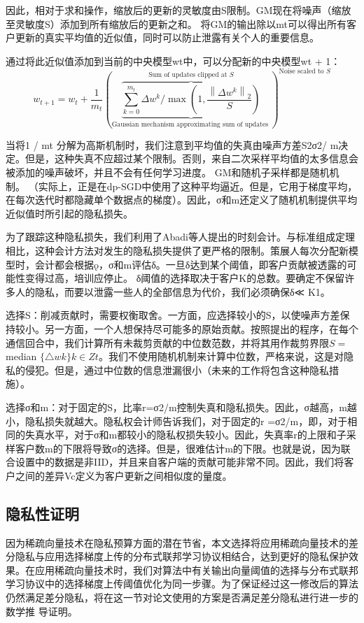 因此，相对于求和操作，缩放后的更新的灵敏度由S限制。GM现在将噪声（缩放至灵敏度S）添加到所有缩放后的更新之和。 将GM的输出除以mt可以得出所有客户更新的真实平均值的近似值，同时可以防止泄露有关个人的重要信息。

通过将此近似值添加到当前的中央模型wt中，可以分配新的中央模型wt + 1：
\begin{equation}
w_{t+1}=w_{t}+\frac{1}{m_{t}}(\underbrace{\overbrace{\sum_{k=0}^{m_{t}} \Delta w^{k} / \max \left(1, \frac{\left\|\Delta w^{k}\right\|_{2}}{S}\right)}^{\text {Sum of updates clipped at } S}}_{\text {Gaussian mechanism approximating sum of updates }})^{\text {Noise scaled to } S}
\end{equation}


当将1 / mt 分解为高斯机制时，我们注意到平均值的失真由噪声方差S2σ2/ m决定。但是，这种失真不应超过某个限制。否则，来自二次采样平均值的太多信息会被添加的噪声破坏，并且不会有任何学习进度。 GM和随机子采样都是随机机制。 （实际上，\cite{ref48}正是在dp-SGD中使用了这种平均逼近。但是，它用于梯度平均，在每次迭代时都隐藏单个数据点的梯度）。因此，σ和m还定义了随机机制提供平均近似值时所引起的隐私损失。

为了跟踪这种隐私损失，我们利用了Abadi等人提出的时刻会计\cite{ref49}。与标准组成定理相比，这种会计方法对发生的隐私损失提供了更严格的限制。策展人每次分配新模型时，会计都会根据ǫ，σ和m评估δ。一旦δ达到某个阈值，即客户贡献被透露的可能性变得过高，培训应停止。 δ阈值的选择取决于客户K的总数。要确定不保留许多人的隐私，而要以泄露一些人的全部信息为代价，我们必须确保δ≪ K1。

选择S：削减贡献时，需要权衡取舍。一方面，应选择较小的S，以使噪声方差保持较小。另一方面，一个人想保持尽可能多的原始贡献。按照\cite{ref50}提出的程序，在每个通信回合中，我们计算所有未裁剪贡献的中位数范数，并将其用作裁剪界限$S=$ median $\{\triangle w k\} k \in Z t$。我们不使用随机机制来计算中位数，严格来说，这是对隐私的侵犯。但是，通过中位数的信息泄漏很小（未来的工作将包含这种隐私措施）。

选择σ和m：对于固定的S，比率r=σ2/m控制失真和隐私损失。因此，σ越高，m越小，隐私损失就越大。隐私权会计师告诉我们，对于固定的r =σ2/m，即，对于相同的失真水平，对于σ和m都较小的隐私权损失较小。因此，失真率r的上限和子采样客户数m的下限将导致σ的选择。但是，很难估计m的下限。也就是说，因为联合设置中的数据是非IID，并且来自客户端的贡献可能非常不同。因此，我们将客户之间的差异Vc定义为客户更新之间相似度的量度。

\subsection{隐私性证明}
因为稀疏向量技术在隐私预算方面的潜在节省，本文选择将应用稀疏向量技术的差分隐私与应用选择梯度上传的分布式联邦学习协议相结合，达到更好的隐私保护效果。在应用稀疏向量技术时，我们对算法中有关输出向量阈值的选择与分布式联邦学习协议中的选择梯度上传阈值优化为同一步骤。为了保证经过这一修改后的算法仍然满足差分隐私，将在这一节对论文使用的方案是否满足差分隐私进行进一步的数学推
导证明。 

